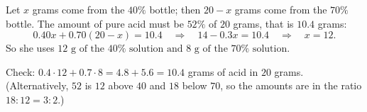 Let $x$ grams come from the $40\%$ bottle; then $20-x$ grams come from the $70\%$ bottle. The amount of pure acid must be $52\%$ of $20$ grams, that is $10.4$ grams:
\[
0.40x+0.70(20-x)=10.4\quad\Longrightarrow\quad 14-0.3x=10.4\quad\Longrightarrow\quad x=12 .
\]
So she uses $\boxed{12\text{ g of the }40\%\text{ solution and }8\text{ g of the }70\%\text{ solution}}$.

Check: $0.4\cdot12+0.7\cdot8=4.8+5.6=10.4$ grams of acid in $20$ grams. (Alternatively, $52$ is $12$ above $40$ and $18$ below $70$, so the amounts are in the ratio $18:12=3:2$.)
